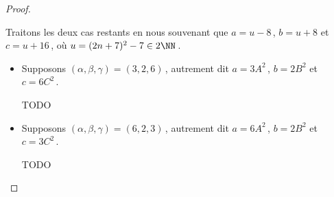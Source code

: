 \begin{proof}
	\begin{center}
	\end{center}


	Traitons les deux cas restants en nous souvenant que $a = u - 8$\,, $b = u + 8$ et $c = u + 16$\,, où $u = (2 n + 7)^2 - 7 \in 2 \NN$\,.
	
	\begin{itemize}
		\item Supposons $(\alpha, \beta, \gamma) = (3, 2, 6)$\,, 
		autrement dit 
		$a = 3 A^2$\,, $b = 2 B^2$ et $c = 6 C^2$\,.
		
		\smallskip
		\noindent
		TODO
		
		\item Supposons $(\alpha, \beta, \gamma) = (6, 2, 3)$\,, 
		autrement dit 
		$a = 6 A^2$\,, $b = 2 B^2$ et $c = 3 C^2$\,.
		
		\smallskip
		\noindent
		TODO
	\end{itemize}
\end{proof}

